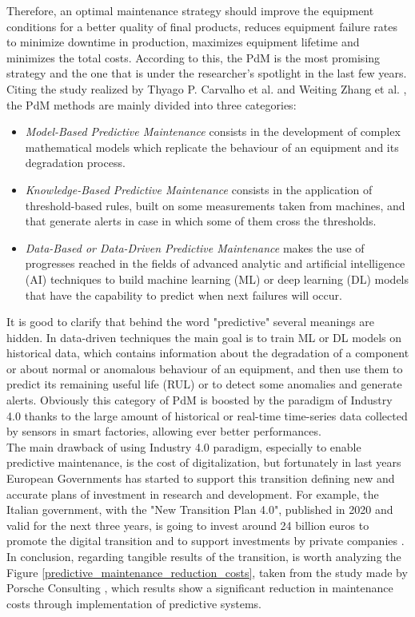 Therefore, an optimal maintenance strategy should improve the equipment conditions for a better quality of final products, reduces equipment failure rates to minimize downtime in production, maximizes equipment lifetime and minimizes the total costs. According to this, the PdM is the most promising strategy and the one that is under the researcher's spotlight in the last few years. \\ 
Citing the study realized by Thyago P. Carvalho et al. \cite{3SystematicLiteratureReviewML} and Weiting Zhang et al. \cite{2DataDrivenMaintenance}, the PdM methods are mainly divided into three categories: 
\begin{itemize}
\item{\textit{Model-Based Predictive Maintenance} consists in the development of complex mathematical models which replicate the behaviour of an equipment and its degradation process.}
\item{\textit{Knowledge-Based Predictive Maintenance} consists in the application of threshold-based rules, built on some measurements taken from machines, and that generate alerts in case in which some of them cross the thresholds.}
\item{\textit{Data-Based or Data-Driven Predictive Maintenance} makes the use of progresses reached in the fields of advanced analytic and artificial intelligence (AI) techniques to build machine learning (ML) or deep learning (DL) models that have the capability to predict when next failures will occur. }
\end{itemize}

It is good to clarify that behind the word "predictive" several meanings are hidden. In data-driven techniques the main goal is to train ML or DL models on historical data, which contains information about the degradation of a component or about normal or anomalous behaviour of an equipment, and then use them to predict its remaining useful life (RUL) or to detect some anomalies and generate alerts. Obviously this category of PdM is boosted by the paradigm of Industry 4.0 thanks to the large amount of historical or real-time time-series data collected by sensors in smart factories, allowing ever better performances.\\
The main drawback of using Industry 4.0 paradigm, especially to enable predictive maintenance, is the cost of digitalization, but fortunately in last years European Governments has started to support this transition defining new and accurate plans of investment in research and development. For example, the Italian government, with the "New Transition Plan 4.0", published in 2020 and valid for the next three years, is going to invest around 24 billion euros to promote the digital transition and to support investments by private companies \cite{12MiseNuovoPianoTransizione}.\\ 
In conclusion, regarding tangible results of the transition, is worth analyzing the Figure \ref{predictive_maintenance_reduction_costs}, taken from the study made by Porsche Consulting \cite{11PorscheStudy}, which results show a significant reduction in maintenance costs through implementation of predictive systems.

